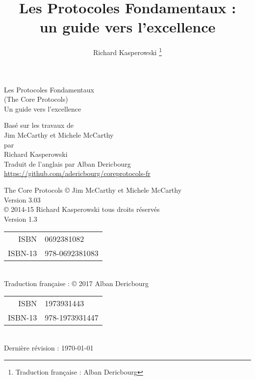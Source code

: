 \documentclass[paper=6in:9in,pagesize=pdftex,headinclude=on,footinclude=on,12pt]{scrbook}
\author{Richard Kasperowski \thanks{Traduction française : Alban Dericbourg}}
\title{Les Protocoles Fondamentaux :\\un guide vers l'excellence}
\date{}
\begin{document}
\frontmatter

\begin{titlepage}
	\sffamily
	\centering

	\vspace*{\fill}

	{\Huge Les Protocoles Fondamentaux\\[-.25em]
	{\LARGE (The Core Protocols)}\\[1em]}
	{\huge Un guide vers l'excellence}

	\vspace*{\fill}
	\vspace*{\fill}

	\vspace*{\fill}
	{\large Basé sur les travaux de}\\[.5em]
	{\LARGE Jim McCarthy {\large et} Michele McCarthy}\\[1em]
	{\large par}\\[.5em]
	{\LARGE Richard Kasperowski}\\[2em]
	Traduit de l'anglais par Alban Dericbourg\\
	{\scriptsize \url{https://github.com/adericbourg/coreprotocols-fr}}\par

	\vspace*{\fill}
\end{titlepage}

\vspace*{\fill}
\begin{center}
	The Core Protocols © Jim McCarthy et Michele McCarthy\\
	Version 3.03\\[1em]

	\copyright{} 2014-15 Richard Kasperowski tous droits réservés\\
	Version 1.3\\
	\begin{tabular}{rl}
		ISBN & 0692381082 \\
		ISBN-13 & 978-0692381083\\
	\end{tabular}\\[1em]

	Traduction française : \copyright{} 2017 Alban Dericbourg\\
	\begin{tabular}{rl}
		ISBN & 1973931443 \\
		ISBN-13 & 978-1973931447\\
	\end{tabular}\\[1em]
	Dernière révision : \today
\end{center}
\pagebreak
\end{document}
